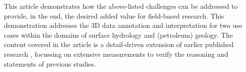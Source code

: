 \documentclass[review]{elsarticle}
\begin{document}

This article demonstrates how the above-listed challenges can be addressed to provide, in the end, the desired added value for field-based research. This demonstration addresses the 3D data annotation and interpretation for two use cases within the domains of surface hydrology and (petroleum) geology. The content covered in the article is a detail-driven extension of earlier published research \cite{Kroehnert2017b}, focussing on extensive measurements to verify the reasoning and statements of previous studies.
\end{document}

